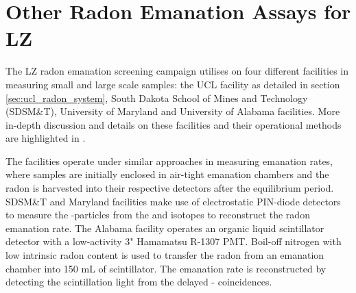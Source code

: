 \section{Other Radon Emanation Assays for LZ}
\label{sec:otherradon}

The LZ radon emanation screening campaign utilises on four different facilities in measuring small and large scale samples: the UCL facility as detailed in section \ref{sec:ucl_radon_system}, South Dakota School of Mines and Technology (SDSM&T), University of Maryland and University of Alabama facilities. More in-depth discussion and details on these facilities and their operational methods are highlighted in \cite{lz_screening}.

The facilities operate under similar approaches in measuring emanation rates, where samples are initially enclosed in air-tight emanation chambers and the radon is harvested into their respective detectors after the equilibrium period. SDSM\&T and Maryland facilities make use of electrostatic PIN-diode detectors to measure the \alpha-particles from the \PoTOF{} and \PoTOE{} isotopes to reconstruct the radon emanation rate. The Alabama facility operates an organic liquid scintillator detector with a low-activity 3" Hamamatsu R-1307 PMT. Boil-off nitrogen with low intrinsic radon content is used to transfer the radon from an emanation chamber into 150 mL of scintillator. The emanation rate is reconstructed by detecting the scintillation light from the delayed \BiTOF-\PoTOF{} coincidences. 

